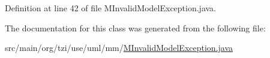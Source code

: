 Definition at line 42 of file M\-Invalid\-Model\-Exception.\-java.



The documentation for this class was generated from the following file\-:\begin{DoxyCompactItemize}
\item 
src/main/org/tzi/use/uml/mm/\hyperlink{_m_invalid_model_exception_8java}{M\-Invalid\-Model\-Exception.\-java}\end{DoxyCompactItemize}
